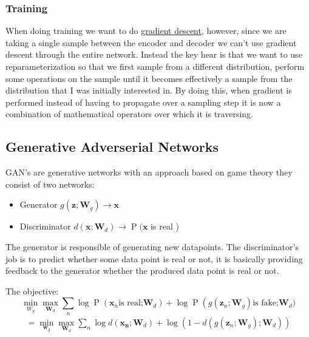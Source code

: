 \documentclass[12pt]{article}
\begin{document}
        \subsubsection{Training}
            When doing training we want to do \hyperref[sec:GD]{gradient descent}, however, since we are taking a single
            sample between the encoder and decoder we can't use gradient descent through the entire network. Instead
            the key hear is that we want to use reparameterization so that we first sample from a different
            distribution, perform some operations on the sample until it becomes effectively a sample from the
            distribution that I was initially interested in. By doing this, when gradient is performed instead of having
            to propagate over a sampling step it is now a combination of mathematical operators over which it is
            traversing.
            
    \subsection{Generative Adverserial Networks} \label{sec:GAN}
        GAN's are generative networks with an approach based on game theory they consist of two networks:
        
        \begin{itemize}
            \item Generator $g\left(\boldsymbol{z} ; \boldsymbol{W}_{g}\right) \rightarrow \boldsymbol{x}$
            \item Discriminator $d\left(\boldsymbol{x} ; \boldsymbol{W}_{d}\right) \rightarrow \operatorname{P}(\boldsymbol{x}$ is real )
        \end{itemize}

        The generator is responsible of generating new datapoints. The discriminator's job is to predict whether some
        data point is real or not, it is basically providing feedback to the generator whether the produced data point
        is real or not.
        
        The objective:
        $$ \min _{W_{g}} \max _{\boldsymbol{W}_{d}} \sum_{n} \log \operatorname{P}\left(\boldsymbol{x}_{n}\right. \text{is
        real;} \left.\boldsymbol{W}_{d}\right)+\log \operatorname{P}\left(g\left(\mathbf{z}_{n} ;
        \boldsymbol{W}_{g}\right)\right. \text{is fake;} \boldsymbol{W}_{d} ) $$
        $$ \begin{array}{l} = \min _{\boldsymbol{w}_{g}} \max _{\boldsymbol{W}_{d}} \sum_{n} \log
        d\left(\boldsymbol{x}_{\boldsymbol{n}} ; \boldsymbol{W}_{d}\right)+\log \left(1-d\left(g\left(\mathbf{z}_{n} ;
        \boldsymbol{W}_{g}\right) ; \boldsymbol{W}_{d}\right)\right)\end{array} $$
\end{document}
